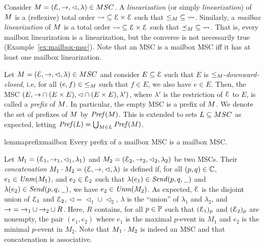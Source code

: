 \documentclass[a4paper,UKenglish,cleveref, autoref, thm-restate]{lipics-v2021}
\begin{document}
Consider $\msc = (\Events,\procrel,\lhd,\lambda) \in \MSCs$.
A \emph{\pp linearization} (or simply \emph{linearization}) of $M$ is a (reflexive) total order
${\rightsquigarrow} \subseteq \mathcal{E} \times \mathcal{E}$ such that ${\le_M} \subseteq
{\rightsquigarrow}$. Similarly,
a \emph{mailbox linearization} of $M$ is a total order
${\rightsquigarrow} \subseteq \mathcal{E} \times \mathcal{E}$ such that ${\preceq_M} \subseteq
{\rightsquigarrow}$. That is, every mailbox linearization is a \pp linearization,
but the converse is not necessarily true (Example~\ref{ex:mailbox-msc}).
Note that an MSC is a mailbox MSC iff it has at least one mailbox linearization.

\medskip

Let $\msc = (\Events,\procrel,\lhd,\lambda) \in \MSCs$ and consider
$E \subseteq \mathcal{E}$ such that $E$ is ${\le_M}$-\emph{downward-closed}, i.e,
for all $(e,f) \in {\le_M}$ such that $f \in E$, we also have $e \in E$.
Then, the MSC $(E,{\to} \cap (E \times E),{\lhd} \cap (E \times E),\lambda')$,
where $\lambda'$ is the restriction of $\mathcal{E}$ to $E$, is called a \emph{prefix}
of $M$. In particular, the empty MSC is a prefix of $M$.
We denote the set of prefixes of $M$ by $\mathit{Pref}(M)$.
This is extended to sets $L \subseteq \MSCs$ as expected, letting
$\mathit{Pref}(L) = \bigcup_{M \in L} \mathit{Pref}(M)$.

\begin{restatable}{lemma}{prefixmailbox}
\label{lem:mb-prefix}
Every prefix of a mailbox MSC is a mailbox MSC.
\end{restatable}

Let $M_1 = (\mathcal{E}_1,\to_1,\lhd_1,\lambda_1)$ and
$M_2 = (\mathcal{E}_2,\to_2,\lhd_2,\lambda_2)$ be two MSCs.
Their \emph{concatenation} $M_1 \cdot M_2 = (\mathcal{E},\to,\lhd,\lambda)$ is defined if, for all $(p,q) \in \mathbb{C}$,
$e_1 \in \mathit{Unm}(M_1)$, and
$e_2 \in \mathcal{E}_2$ such that $\lambda(e_1) \in {\mathit{Send}(p,q,\hspace{0.1em}\underline{\hspace{0.5em}}\hspace{0.1em})}$
and $\lambda(e_2) \in {\mathit{Send}(p,q,\hspace{0.1em}\underline{\hspace{0.5em}}\hspace{0.1em})}$,
we have $e_2 \in \mathit{Unm}(M_2)$.
As expected, $\mathcal{E}$ is the disjoint union of $\mathcal{E}_1$ and $\mathcal{E}_2$,
${\lhd}  = {\lhd_1} \cup {\lhd_2}$, $\lambda$ is the ``union'' of $\lambda_1$
and $\lambda_2$, and ${\to} = {\to_1} \cup {\to_2} \cup R$.
Here, $R$ contains, for all $p \in \mathbb{P}$ such that $(\mathcal{E}_1)_p$ and
$(\mathcal{E}_2)_p$ are nonempty, the pair $(e_1,e_2)$ where $e_1$ is the
maximal $p$-event in $M_1$ and $e_2$ is the minimal $p$-event in $M_2$.
Note that $M_1 \cdot M_2$ is indeed an MSC and that
concatenation is associative.
\end{document}
